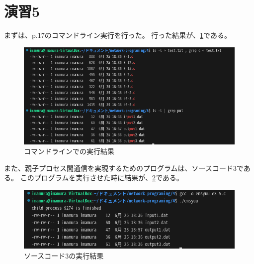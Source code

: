 \documentclass[documentclass]{jsarticle}
\begin{document}
\section*{演習5}
まずは、p.17のコマンドライン実行を行った。
行った結果が、\ref*{fig:5-1}である。
\begin{figure}
  \begin{center}
    \includegraphics*[scale=0.8]{figure/5-1.png}
  \end{center}
  \caption{コマンドラインでの実行結果}
  \label{fig:5-1}
\end{figure}

また、親子プロセス間通信を実現するためのプログラムは、ソースコード3である。
このプログラムを実行させた時に結果が、\ref*{fig:5-2}である。

\begin{figure}[H]
  \begin{center}
    \includegraphics*[scale=0.8]{figure/5-2.png}
  \end{center}
  \caption{ソースコード3の実行結果}
  \label{fig:5-2}
\end{figure}
\end{document}
